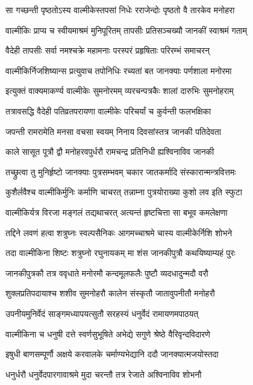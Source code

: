 \twolineshloka
{सा गच्छन्ती पृष्ठतोऽस्य वाल्मीकेस्तपसां निधेः}
{रराजेन्दोः पृष्ठतो वै तारकेव मनोहरा}%

\twolineshloka
{वाल्मीकिः प्राप्य च स्वीयमाश्रमं मुनिपूरितम्}
{तापसीः प्रतिसञ्चख्यौ जानकीं स्वाश्रमं गताम्}%

\twolineshloka
{वैदेही तापसीः सर्वा नमश्चक्रे महामनाः}
{परस्परं प्रहृषिताः परिरम्भं समाचरन्}%

\twolineshloka
{वाल्मीकिर्निजशिष्यान्स प्रत्युवाच तपोनिधिः}
{रच्यतां बत जानक्याः पर्णशाला मनोरमा}%

\twolineshloka
{इत्युक्तं वाक्यमाकर्ण्य वाल्मीकेः सुमनोरमम्}
{व्यरचन्पत्रकैः शालां दारुभिः सुमनोहराम्}%

\twolineshloka
{तत्रावसद्धि वैदेही पतिव्रतपरायणा}
{वाल्मीकेः परिचर्यां च कुर्वन्ती फलभक्षिका}%

\twolineshloka
{जपन्ती रामरामेति मनसा वचसा स्वयम्}
{निनाय दिवसांस्तत्र जानकी पतिदेवता}%

\twolineshloka
{काले सासूत पूत्रौ द्वौ मनोहरवपुर्धरौ}
{रामचन्द्र प्रतिनिधी ह्यश्विनाविव जानकी}%

\twolineshloka
{तच्छ्रुत्वा तु मुनिर्हृष्टो जानक्याः पुत्रसम्भवम्}
{चकार जातकर्मादि संस्कारान्मन्त्रवित्तमः}%

\twolineshloka
{कुशैर्लवैश्च वाल्मीकिर्मुनिः कर्माणि चाचरत्}
{तन्नाम्ना पुत्रयोराख्या कुशो लव इति स्फुटा}%

\twolineshloka
{वाल्मीकिर्यत्र विरजा मङ्गलं तद्यथाचरत्}
{अत्यन्तं हृष्टचित्ता सा बभूव कमलेक्षणा}%

\twolineshloka
{तद्दिने लवणं हत्वा शत्रुघ्नः स्वल्पसैनिकः}
{आगमच्चाश्रमे चास्य वाल्मीकेर्निशि शोभने}%

\twolineshloka
{तदा वाल्मीकिना शिष्टः शत्रुघ्नो रघुनायकम्}
{मा शंस जानकीपुत्रौ कथयिष्याम्यहं पुरः}%

\twolineshloka
{जानकीपुत्रकौ तत्र ववृधाते मनोरमौ}
{कन्दमूलफलैः पुष्टौ व्यदधादुन्मदौ वरौ}%

\twolineshloka
{शुक्लप्रतिपदायाश्च शशीव सुमनोहरौ}
{कालेन संस्कृतौ जातावुपनीतौ मनोहरौ}%

\twolineshloka
{उपनीयमुनिर्वेदं साङ्गमध्यापयत्सुतौ}
{सरहस्यं धनुर्वेदं रामायणमपाठयत्}%

\twolineshloka
{वाल्मीकिना च धनुषी दत्ते स्वर्णसुभूषिते}
{अभेद्ये सगुणे श्रेष्ठे वैरिवृन्दविदारणे}%

\twolineshloka
{इषुधी बाणसम्पूर्णौ अक्षये करवालके}
{चर्माण्यभेद्यानि ददौ जानक्यात्मजयोस्तदा}%

\twolineshloka
{धनुर्धरौ धनुर्वेदपारगावाश्रमे मुदा}
{चरन्तौ तत्र रेजाते अश्विनाविव शोभनौ}%

